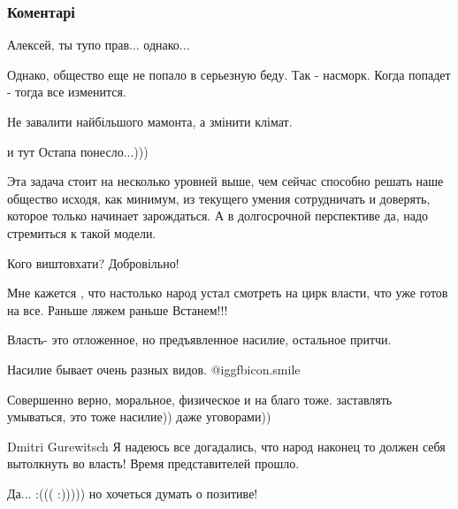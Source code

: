  
 
 
 
 
\subsubsection{Коментарі}

\begin{itemize} %
Алексей, ты тупо прав... однако...


Однако, общество еще не попало в серьезную беду. Так - насморк.
Когда попадет - тогда все изменится.

Не завалити найбільшого мамонта, а змінити клімат.

и тут Остапа понесло...)))


Эта задача стоит на несколько уровней выше, чем сейчас способно решать наше
общество исходя, как минимум, из текущего умения сотрудничать и доверять,
которое только начинает зарождаться. А в долгосрочной перспективе да, надо
стремиться к такой модели.

Кого виштовхати? Добровільно!

Мне кажется , что настолько народ устал смотреть на цирк власти, что уже готов на все. Раньше ляжем раньше Встанем!!!


Власть- это отложенное, но предъявленное насилие, остальное притчи.

Насилие бывает очень разных видов. @igg{fbicon.smile} 

Совершенно верно, моральное, физическое и на благо тоже. заставлять умываться, это тоже насилие)) даже уговорами))

Dmitri Gurewitsch
Я надеюсь все догадались, что народ наконец то должен себя вытолкнуть во власть! Время представителей прошло.

Да... :((( :))))) но хочеться думать о позитиве!


\end{itemize}
